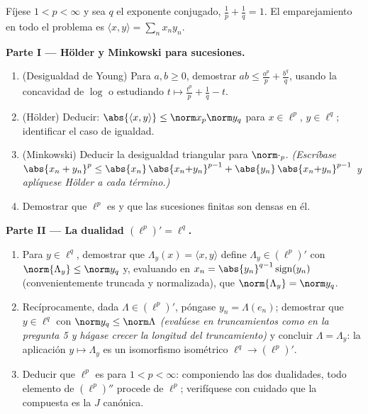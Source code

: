 \begin{problem}[{Problema de fin de semana --- $(\ell^p)' = \ell^q$,
reflexividad y la rareza de $\ell^\infty$}]
\label{pb:b3:banach:1}
Fíjese $1 < p < \infty$ y sea $q$ el exponente conjugado,
$\frac1p + \frac1q = 1$. El emparejamiento en todo el problema es
$\langle x,
y\rangle = \sum_n x_ny_n$.

\medskip
\noindent\textbf{Parte I --- Hölder y Minkowski para sucesiones.}
\begin{enumerate}
  \item (Desigualdad de Young) Para $a, b \geq 0$, demostrar $ab \leq
        \frac{a^p}p + \frac{b^q}q$, usando la concavidad de $\log$ o
  estudiando $t \mapsto \frac{t^p}p + \frac1q - t$. \item (Hölder)
  Deducir: $\abs{\langle x, y\rangle} \leq
        \norm x_p\norm y_q$ para $x \in \ell^p$, $y \in \ell^q$;
  identificar el caso de igualdad. \item (Minkowski) Deducir la
  desigualdad triangular para $\norm\cdot_p$. \emph{(Escríbase
  $\abs{x_n + y_n}^p \leq
        \abs{x_n}\,\abs{x_n{+}y_n}^{p-1} +
        \abs{y_n}\,\abs{x_n{+}y_n}^{p-1}$ y aplíquese Hölder a cada
  término.)} \item Demostrar que $\ell^p$ es
   y que las sucesiones
  finitas son densas en él.
\end{enumerate}

\medskip
\noindent\textbf{Parte II --- La dualidad $(\ell^p)' =
\ell^q$.}
\begin{enumerate}[resume]
  \item Para $y \in \ell^q$, demostrar que $\Lambda_y(x) = \langle
        x, y\rangle$ define $\Lambda_y \in (\ell^p)'$ con
  $\norm{\Lambda_y} \leq \norm y_q$ y, evaluando en
        $x_n = \abs{y_n}^{q-1}\operatorname{sign}(y_n)$
        (convenientemente truncada y normalizada), que
        $\norm{\Lambda_y} = \norm y_q$.
  \item Recíprocamente, dada $\Lambda \in (\ell^p)'$, póngase $y_n =
        \Lambda(e_n)$; demostrar que $y \in \ell^q$ con $\norm y_q \leq
        \norm\Lambda$ \emph{(evalúese en truncamientos como en la
  pregunta 5 y hágase crecer la longitud del truncamiento)} y concluir
  $\Lambda = \Lambda_y$: la aplicación $y \mapsto \Lambda_y$ es un
  isomorfismo isométrico $\ell^q \to (\ell^p)'$. \item Deducir que
  $\ell^p$ es \emph{} para
  $1 < p <
        \infty$: componiendo las dos dualidades, todo elemento de
  $(\ell^p)''$ procede de $\ell^p$; verifíquese con cuidado que la
  compuesta es la $J$ canónica.
\end{enumerate}


\end{problem}
